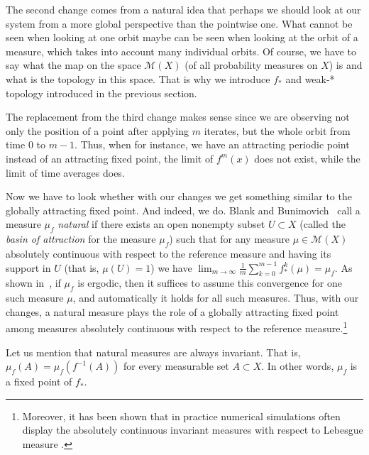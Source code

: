 \documentclass[format=acmsmall, authorversion, screen=true]{acmart}
\newcommand{\muf}{\mu_f}
\def\R{\ensuremath{\mathbb{R}}}
\newcommand{\calm}{\mathcal{M}}
\renewcommand{\phi}{\varphi}
\begin{document}
The second change comes from a natural idea that perhaps we should look
at our system from a more global perspective than the pointwise one.
What cannot be seen when looking at one orbit maybe can be seen when
looking at the orbit of a measure, which takes into account many
individual orbits. Of course, we have to say what the map on the space
$\calm(X)$ (of all probability measures on $X$) is and what is the
topology in this space. That is why we introduce $f_*$ and weak-* topology introduced in the previous section.

The replacement from the third change makes sense since we are
observing not only the position of a point after applying $m$
iterates, but the whole orbit from time 0 to $m-1$. Thus, when for
instance, we have an attracting periodic point instead of an
attracting fixed point, the limit of $f^m(x)$ does not exist, while
the limit of time averages does.

Now we have to look whether with our changes we get something similar
to the globally attracting fixed point. And indeed, we do. Blank and
Bunimovich~\cite{blank2003multicomponent} call a measure $\muf$ \emph{natural} if there
exists an open nonempty subset $U\subset X$ (called the \emph{basin of
  attraction} for the measure $\muf$) such that for any measure
$\mu\in\calm(X)$ absolutely continuous with respect to the reference
measure and having its support in $U$ (that is, $\mu(U)=1$) we
have $\lim_{m\to\infty}\frac1m\sum_{k=0}^{m-1}f_*^k(\mu)=\muf$. As
shown in~\cite{misiurewicz2005ergodic}, if $\muf$ is ergodic, then it suffices to assume
this convergence for one such measure $\mu$, and automatically it
holds for all such measures. Thus, with our changes, a natural measure
plays the role of a globally attracting fixed point among measures
absolutely continuous with respect to the reference measure.\footnote{Moreover, it has been shown that in practice numerical simulations often display the absolutely continuous invariant measures with respect to Lebesgue measure \cite{gora1988computers}.}

Let us mention that natural measures are always invariant. That is,
$\muf(A)=\muf(f^{-1}(A))$ for every measurable set $A\subset X$. In
other words, $\muf$ is a fixed point of $f_*$.
\end{document}

